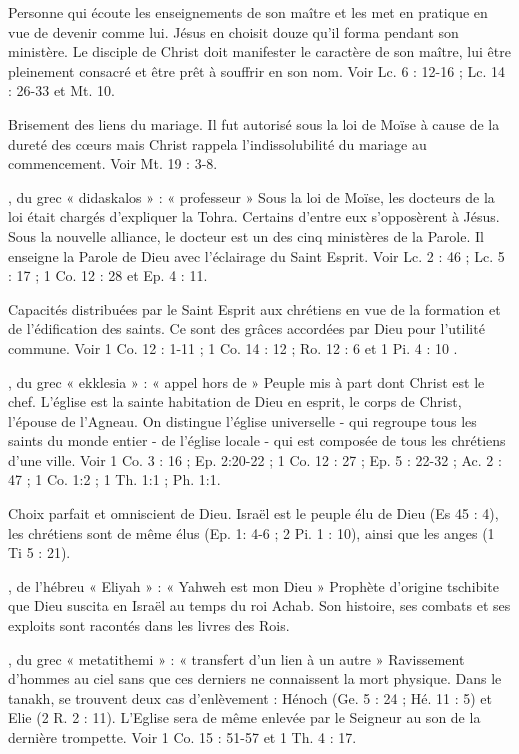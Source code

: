 \begin{multicols}{2}
Personne qui écoute les enseignements de son maître et les met en pratique en vue de devenir comme lui. Jésus en choisit douze qu’il forma pendant son ministère. Le disciple de Christ doit manifester le caractère de son maître, lui être pleinement consacré et être prêt à souffrir en son nom. Voir Lc. 6 : 12-16 ; Lc. 14 : 26-33 et Mt. 10.

Brisement des liens du mariage. Il fut autorisé sous la loi de Moïse à cause de la dureté des cœurs mais Christ rappela l'indissolubilité du mariage au commencement. Voir Mt. 19 : 3-8.

, du grec « didaskalos » : « professeur »
Sous la loi de Moïse, les docteurs de la loi était chargés d'expliquer la Tohra. Certains d’entre eux s'opposèrent à Jésus. Sous la nouvelle alliance, le docteur est un des cinq ministères de la Parole. Il enseigne la Parole de Dieu avec l'éclairage du Saint Esprit. Voir Lc. 2 : 46 ; Lc. 5 : 17 ; 1 Co. 12 : 28 et Ep. 4 : 11.

Capacités distribuées par le Saint Esprit aux chrétiens en vue de la formation et de l'édification des saints. Ce sont des grâces accordées par Dieu pour l’utilité commune. Voir 1 Co. 12 : 1-11 ; 1 Co. 14 : 12 ; Ro. 12 : 6 et 1 Pi. 4 : 10 .

, du grec « ekklesia » : « appel hors de »
Peuple mis à part dont Christ est le chef. L’église est la sainte habitation de Dieu en esprit, le corps de Christ, l’épouse de l’Agneau. On distingue l’église universelle - qui regroupe tous les saints du monde entier - de l’église locale - qui est composée de tous les chrétiens d'une ville. Voir 1 Co. 3 : 16 ; Ep. 2:20-22 ; 1 Co. 12 : 27 ; Ep. 5 : 22-32 ; Ac. 2 : 47 ; 1 Co. 1:2 ; 1 Th. 1:1 ; Ph. 1:1.

Choix parfait et omniscient de Dieu. Israël est le peuple élu de Dieu (Es 45 : 4), les chrétiens sont de même élus (Ep. 1: 4-6 ; 2 Pi. 1 : 10), ainsi que les anges (1 Ti 5 : 21).

, de l’hébreu « Eliyah » : « Yahweh est mon Dieu »
Prophète d’origine tschibite que Dieu suscita en Israël au temps du roi Achab. Son histoire, ses combats et ses exploits sont racontés dans les livres des Rois.

, du grec « metatithemi » : « transfert d’un lien à un autre »
Ravissement d'hommes au ciel sans que ces derniers ne connaissent la mort physique. Dans le tanakh, se trouvent deux cas d'enlèvement : Hénoch (Ge. 5 : 24 ; Hé. 11 : 5) et Elie (2 R. 2 : 11). L'Eglise sera de même enlevée par le Seigneur au son de la dernière trompette. Voir 1 Co. 15 : 51-57 et 1 Th. 4 : 17.


\end{multicols}
